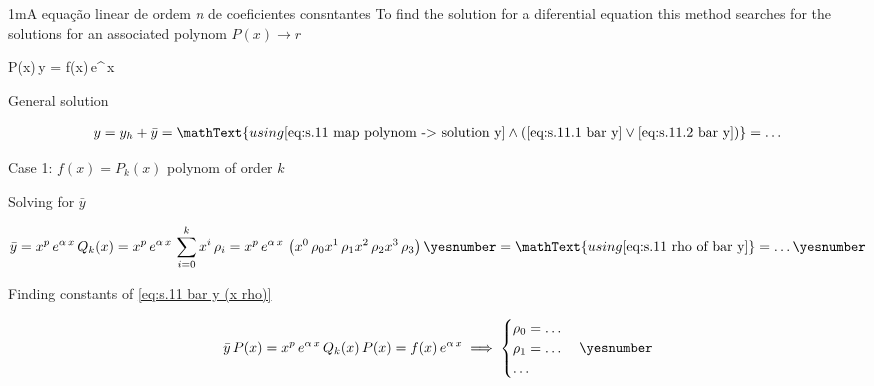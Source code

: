 \documentclass["AM3C-Slides_annotations.tex"]{subfiles}
\begin{document}
\begin{sectionBox}1m{A equação linear de ordem \textit{n} de coeficientes consntantes} %
  \label{sec:linear diffeq ord:n constcoeff}
  To find the solution for a diferential equation this method searches for the solutions for an associated polynom \(P(x) \to r\)

  \begin{BM}
    P(x)\,y = f(x)\,e^{\alpha\,x}
  \end{BM}

  General solution
  \begin{tcolorbox}
    \begin{gather*}
      y = y_h + \bar{y}
      = \mathText{using
        \eqref{eq:s.11 map polynom -> solution y}
        \land
        (
          \eqref{eq:s.11.1 bar y}
          \lor
          \eqref{eq:s.11.2 bar y}
        )
      }
      = \dots
    \end{gather*}
  \end{tcolorbox}

  Case 1: \(f(x) = P_k(x)\) polynom of order \(k\)
  \begin{tcolorbox}
    Solving for \(\bar{y}\)
    \begin{tcolorbox}
      \begin{gather*}
        \bar{y}
        = x^p\,e^{\alpha\,x}
        \,Q_k(x)
        = x^p\,e^{\alpha\,x}
        \,\sum_{i=0}^{k}{
          x^i\,\rho_i
        }
        = x^p\,e^{\alpha\,x}
        \,\left(
          x^0\,\rho_0
          x^1\,\rho_1
          x^2\,\rho_2
          x^3\,\rho_3
        \right)
        \yesnumber\label{eq:s.11 bar y (x rho)}
        = \mathText{using \eqref{eq:s.11 rho of bar y}}
        = \dots
        \yesnumber\label{eq:s.11.1 bar y}
      \end{gather*}
    \end{tcolorbox}

    Finding constants of \eqref{eq:s.11 bar y (x rho)}
    \begin{tcolorbox}
      \begin{gather*}
        \bar{y}\,P(x)
        = x^p\,e^{\alpha\,x}\,Q_k(x)
        \,P(x)
        = f(x)\,e^{\alpha\,x}
        \implies
        \begin{cases}
          \rho_0 = \dots
          \\ \rho_1 = \dots
          \\ \dots
        \end{cases}
        \yesnumber\label{eq:s.11 rho of bar y}
      \end{gather*}
    \end{tcolorbox}
  \end{tcolorbox}


\end{sectionBox}
\end{document}

